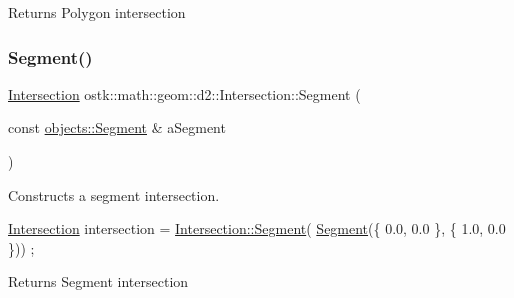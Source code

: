 \begin{DoxyReturn}{Returns}
Polygon intersection 
\end{DoxyReturn}
\mbox{\label{classostk_1_1math_1_1geom_1_1d2_1_1_intersection_a6bb661360b82d21556a832506eea0c16}} 
\subsubsection{\texorpdfstring{Segment()}{Segment()}}
{\footnotesize\ttfamily \hyperlink{classostk_1_1math_1_1geom_1_1d2_1_1_intersection}{Intersection} ostk\+::math\+::geom\+::d2\+::\+Intersection\+::\+Segment (\begin{DoxyParamCaption}\item[{const \hyperlink{classostk_1_1math_1_1geom_1_1d2_1_1objects_1_1_segment}{objects\+::\+Segment} \&}]{a\+Segment }\end{DoxyParamCaption})\hspace{0.3cm}{\ttfamily [static]}}



Constructs a segment intersection. 


\begin{DoxyCode}
\hyperlink{classostk_1_1math_1_1geom_1_1d2_1_1_intersection_a52e7ba577832b73a1eb5c95eaddf2834}{Intersection} intersection = \hyperlink{classostk_1_1math_1_1geom_1_1d2_1_1_intersection_a6bb661360b82d21556a832506eea0c16}{Intersection::Segment}(
      \hyperlink{classostk_1_1math_1_1geom_1_1d2_1_1_intersection_a6bb661360b82d21556a832506eea0c16}{Segment}(\{ 0.0, 0.0 \}, \{ 1.0, 0.0 \})) ;
\end{DoxyCode}


\begin{DoxyReturn}{Returns}
Segment intersection 
\end{DoxyReturn}
\mbox{\label{classostk_1_1math_1_1geom_1_1d2_1_1_intersection_a745e7e2a6986dc19ab955e6b6f288af2}} 
